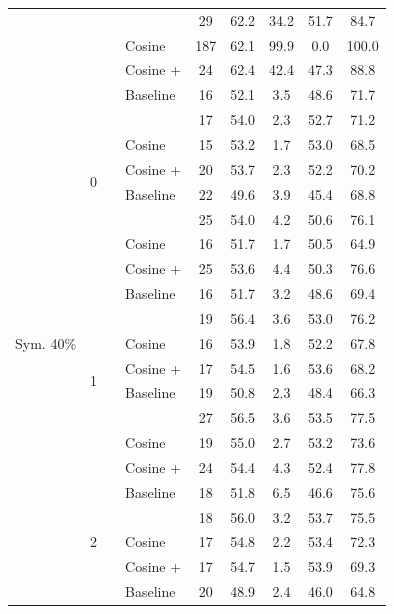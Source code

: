 \begin{longtable}{lll l c c c c c}
 &  &  & \method{} & 29 & 62.2 & 34.2 & 51.7 & 84.7 \\
 &  &  & Cosine & 187 & 62.1 & 99.9 & 0.0 & 100.0 \\
 &  &  & Cosine + \method{} & 24 & 62.4 & 42.4 & 47.3 & 88.8 \\
\midrule
\multirow{40}{*}{Sym. 40\%} & \multirow{8}{*}{0} & \multirow{4}{*}{\adamw{}} & Baseline & 16 & 52.1 & 3.5 & 48.6 & 71.7 \\
 &  &  & \method{} & 17 & 54.0 & 2.3 & 52.7 & 71.2 \\
 &  &  & Cosine & 15 & 53.2 & 1.7 & 53.0 & 68.5 \\
 &  &  & Cosine + \method{} & 20 & 53.7 & 2.3 & 52.2 & 70.2 \\
\cmidrule(lr){3-9}
 &  & \multirow{4}{*}{\sgdm{}} & Baseline & 22 & 49.6 & 3.9 & 45.4 & 68.8 \\
 &  &  & \method{} & 25 & 54.0 & 4.2 & 50.6 & 76.1 \\
 &  &  & Cosine & 16 & 51.7 & 1.7 & 50.5 & 64.9 \\
 &  &  & Cosine + \method{} & 25 & 53.6 & 4.4 & 50.3 & 76.6 \\
\cmidrule(lr){2-9}
 & \multirow{8}{*}{1} & \multirow{4}{*}{\adamw{}} & Baseline & 16 & 51.7 & 3.2 & 48.6 & 69.4 \\
 &  &  & \method{} & 19 & 56.4 & 3.6 & 53.0 & 76.2 \\
 &  &  & Cosine & 16 & 53.9 & 1.8 & 52.2 & 67.8 \\
 &  &  & Cosine + \method{} & 17 & 54.5 & 1.6 & 53.6 & 68.2 \\
\cmidrule(lr){3-9}
 &  & \multirow{4}{*}{\sgdm{}} & Baseline & 19 & 50.8 & 2.3 & 48.4 & 66.3 \\
 &  &  & \method{} & 27 & 56.5 & 3.6 & 53.5 & 77.5 \\
 &  &  & Cosine & 19 & 55.0 & 2.7 & 53.2 & 73.6 \\
 &  &  & Cosine + \method{} & 24 & 54.4 & 4.3 & 52.4 & 77.8 \\
\cmidrule(lr){2-9}
 & \multirow{8}{*}{2} & \multirow{4}{*}{\adamw{}} & Baseline & 18 & 51.8 & 6.5 & 46.6 & 75.6 \\
 &  &  & \method{} & 18 & 56.0 & 3.2 & 53.7 & 75.5 \\
 &  &  & Cosine & 17 & 54.8 & 2.2 & 53.4 & 72.3 \\
 &  &  & Cosine + \method{} & 17 & 54.7 & 1.5 & 53.9 & 69.3 \\
\cmidrule(lr){3-9}
 &  & \multirow{4}{*}{\sgdm{}} & Baseline & 20 & 48.9 & 2.4 & 46.0 & 64.8 \\

\end{longtable}

